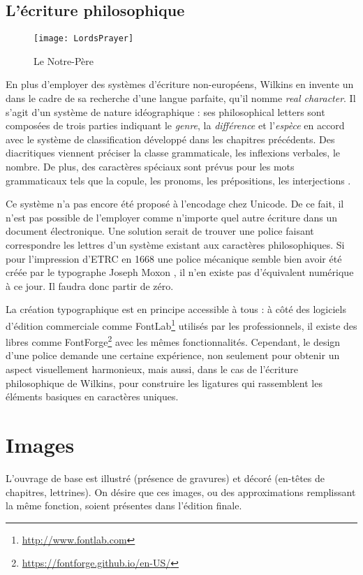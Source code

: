 \subsection{L'écriture philosophique}
\begin{figure}[h]
   \caption{\label{LordsPrayer} Le Notre-Père}
   \texttt{[image: LordsPrayer]}
\end{figure}
En plus d'employer des systèmes d'écriture non-européens, Wilkins en invente un dans le cadre de sa recherche d'une langue parfaite, qu'il nomme \emph{real character}.
Il s'agit d'un système de nature idéographique : ses \og philosophical letters\fg{} sont composées de trois parties indiquant le \emph{genre}, la \emph{différence} et l'\emph{espèce} en accord avec le système de classification développé dans les chapitres précédents.
Des diacritiques viennent préciser la classe grammaticale, les inflexions verbales, le nombre.
De plus, des caractères spéciaux sont prévus pour les mots grammaticaux tels que la copule, les pronoms, les prépositions, les interjections \parencite[part. IV, chap. I]{wilkins_essay_1668}.

Ce système n'a pas encore été proposé à l'encodage chez Unicode.
De ce fait, il n'est pas possible de l'employer comme n'importe quel autre écriture dans un document électronique.
Une solution serait de trouver une police faisant correspondre les lettres d'un système existant aux caractères philosophiques.
Si pour l'impression d'ETRC en 1668 une police mécanique semble bien avoir été créée par le typographe Joseph Moxon \parencite{bryden_moxon_2004}, il n'en existe pas d'équivalent numérique à ce jour.
Il faudra donc partir de zéro.

La création typographique est en principe accessible à tous : à côté des logiciels d'édition commerciale comme FontLab\footnote{\url{http://www.fontlab.com}} utilisés par les professionnels, il existe des libres comme FontForge\footnote{\url{https://fontforge.github.io/en-US/}} avec les mêmes fonctionnalités.
Cependant, le design d'une police demande une certaine expérience, non seulement pour obtenir un aspect visuellement harmonieux, mais aussi, dans le cas de l'écriture philosophique de Wilkins, pour construire les ligatures qui rassemblent les éléments basiques en caractères uniques.

\section{Images}\label{DéfisImages}
L'ouvrage de base est illustré (présence de gravures) et décoré (en-têtes de chapitres, lettrines).
On désire que ces images, ou des approximations remplissant la même fonction, soient présentes dans l'édition finale.

